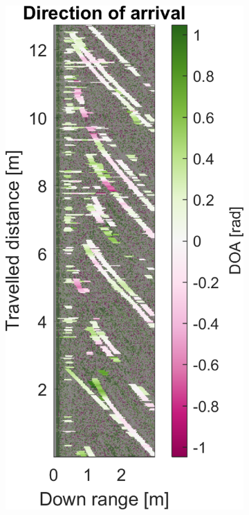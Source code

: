 \begin{figure}[htbp]
\begin{subfigure}[t]{0.475\linewidth}
    \end{subfigure}\bigskip\\
    \begin{subfigure}[t]{0.475\linewidth}
        \centering
        \includegraphics[width=\linewidth,max height=.475\textheight]{gfx/results/queue_doa.png}

\end{subfigure}
\end{figure}
